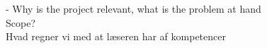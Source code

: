 	- Why is the project relevant, what is the problem at hand \\
	Scope? \cite{pmpp} \\
	Hvad regner vi med at læseren har af kompetencer